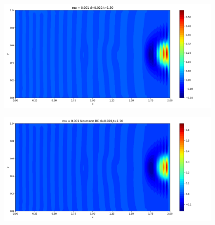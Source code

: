 \documentclass[12pt]{article}
\begin{document}
\begin{figure}[H]
\begin{minipage}{\linewidth}
    \begin{minipage}{0.5\textwidth}
    \includegraphics[width=\linewidth]{figuresmu/mu3d0.020t1.50.png}
    \label{fig7}
    \end{minipage}\hfill
    \begin{minipage}{0.5\textwidth}
    \includegraphics[width=\linewidth]{figuresmu/mu3Nud0.020t1.50.png}
    \label{fig8}
    \end{minipage}
    \vspace{-1.5em}
    

\end{minipage}
\end{figure}
\end{document}
